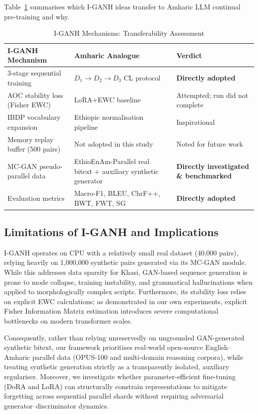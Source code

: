 \documentclass[11pt,a4paper]{article}
\begin{document}
Table~\ref{tab:transfer} summarises which I-GANH ideas transfer to
Amharic LLM continual pre-training and why.

\begin{table}[!htbp]
\caption{I-GANH Mechanisms: Transferability Assessment}
\label{tab:transfer}
\centering
\small
\begin{tabular}{p{4.2cm}p{5.8cm}p{5.2cm}}
\toprule
\textbf{I-GANH Mechanism} & \textbf{Amharic Analogue} & \textbf{Verdict} \\
\midrule
3-stage sequential training & $D_1\to D_2\to D_3$ CL protocol & \textbf{Directly adopted} \\
AOC stability loss (Fisher EWC) & LoRA+EWC baseline & Attempted; run did not complete \\
IBDP vocabulary expansion & Ethiopic normalisation pipeline & Inspirational \\
Memory replay buffer (500 pairs) & Not adopted in this study & Noted for future work \\
MC-GAN pseudo-parallel data & EthioEnAm-Parallel real bitext + auxiliary synthetic generator & \textbf{Directly investigated \& benchmarked} \\
Evaluation metrics & Macro-F1, BLEU, ChrF++, BWT, FWT, SG & \textbf{Directly adopted} \\
\bottomrule
\end{tabular}
\end{table}

\subsection{Limitations of I-GANH and Implications}

I-GANH operates on CPU with a relatively small real dataset (40,000 pairs),
relying heavily on 1,000,000 synthetic pairs generated via its MC-GAN module.
While this addresses data sparsity for Khasi, GAN-based sequence generation
is prone to mode collapse, training instability, and grammatical hallucinations
when applied to morphologically complex scripts.  Furthermore, its stability
loss relies on explicit EWC calculations; as demonstrated in our own
experiments, explicit Fisher Information Matrix estimation introduces severe
computational bottlenecks on modern transformer scales.

Consequently, rather than relying unreservedly on ungrounded GAN-generated
synthetic bitext, our framework prioritises real-world open-source English--Amharic
parallel data (OPUS-100 and multi-domain reasoning corpora), while treating
synthetic generation strictly as a transparently isolated, auxiliary regulariser.
Moreover, we investigate whether parameter-efficient fine-tuning (DoRA and LoRA)
can structurally constrain representations to mitigate forgetting across sequential
parallel shards without requiring adversarial generator--discriminator dynamics.
\end{document}
